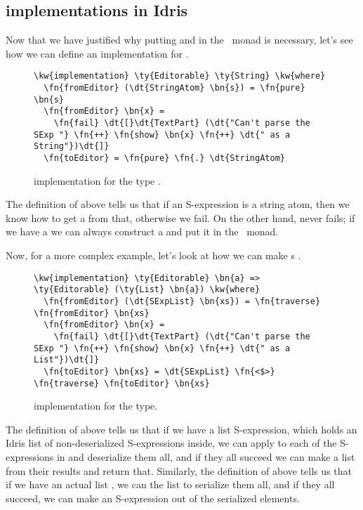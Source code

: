 \subsection{ implementations in Idris}

Now that we have justified why putting  and 
in the \Elab\ monad is necessary,
let's see how we can define an  implementation for .

\begin{figure}[ht]
\caption{ implementation for the type .}
\begin{Verbatim}[framesep=2mm, label=\footnotesize{\normalfont{Idris}}, labelposition=topline]
\kw{implementation} \ty{Editorable} \ty{String} \kw{where}
  \fn{fromEditor} (\dt{StringAtom} \bn{s}) = \fn{pure} \bn{s}
  \fn{fromEditor} \bn{x} =
    \fn{fail} \dt{[}\dt{TextPart} (\dt{"Can't parse the SExp "} \fn{++} \fn{show} \bn{x} \fn{++} \dt{" as a String"})\dt{]}
  \fn{toEditor} = \fn{pure} \fn{.} \dt{StringAtom}
\end{Verbatim}
\end{figure}

The definition of  above tells us that if an S-expression is a
string atom, then we know how to get a  from that, otherwise we
fail.  On the other hand,  never fails; if we have a 
we can always construct a  and put it in the \Elab\ monad.

Now, for a more complex example, let's look at how we can make s .

\begin{figure}[ht]
  \caption{ implementation for the  type.}
\begin{Verbatim}[framesep=2mm, label=\footnotesize{\normalfont{Idris}}, labelposition=topline]
\kw{implementation} \ty{Editorable} \bn{a} => \ty{Editorable} (\ty{List} \bn{a}) \kw{where}
  \fn{fromEditor} (\dt{SExpList} \bn{xs}) = \fn{traverse} \fn{fromEditor} \bn{xs}
  \fn{fromEditor} \bn{x} =
    \fn{fail} \dt{[}\dt{TextPart} (\dt{"Can't parse the SExp "} \fn{++} \fn{show} \bn{x} \fn{++} \dt{" as a List"})\dt{]}
  \fn{toEditor} \bn{xs} = \dt{SExpList} \fn{<$>} \fn{traverse} \fn{toEditor} \bn{xs}
\end{Verbatim}
\end{figure}

The definition of  above tells us that if we have a list
S-expression, which holds an Idris list  of non-deserialized
S-expressions inside, we can apply  to each of the S-expressions
in  and deserialize them all, and if they all succeed we can make a list
from their results and return that.
Similarly, the definition of  above tells us that if we have an
actual list , we can  the list to serialize them all, and
if they all succeed, we can make an S-expression out of the serialized
elements.

